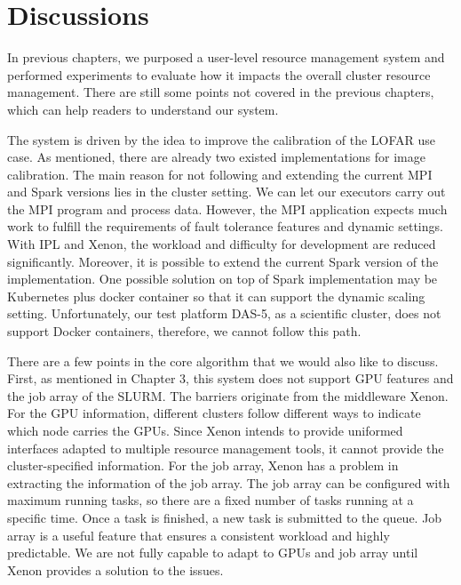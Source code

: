 
\chapter{Discussions} %






% 


In previous chapters, we purposed a user-level resource management system and performed experiments to evaluate how it impacts the overall cluster resource management. 
There are still some points not covered in the previous chapters, which can help readers to understand our system.

The system is driven by the idea to improve the calibration of the LOFAR use case.
As mentioned, there are already two existed implementations for image calibration. 
The main reason for not following and extending the current MPI and Spark versions lies in the cluster setting. 
We can let our executors carry out the MPI program and process data. 
However, the MPI application expects much work to fulfill the requirements of fault tolerance features and dynamic settings.
With IPL and Xenon, the workload and difficulty for development are reduced significantly.  
Moreover, it is possible to extend the current Spark version of the implementation. 
One possible solution on top of Spark implementation may be Kubernetes plus docker container so that it can support the dynamic scaling setting. 
Unfortunately, our test platform DAS-5, as a scientific cluster, does not support Docker containers, therefore, we cannot follow this path.

There are a few points in the core algorithm that we would also like to discuss. 
First, as mentioned in Chapter 3, this system does not support GPU features and the job array of the SLURM. 
The barriers originate from the middleware Xenon. For the GPU information, different clusters follow different ways to indicate which node carries the GPUs. 
Since Xenon intends to provide uniformed interfaces adapted to multiple resource management tools, it cannot provide the cluster-specified information. 
For the job array, Xenon has a problem in extracting the information of the job array. 
The job array can be configured with maximum running tasks, so there are a fixed number of tasks running at a specific time. 
Once a task is finished, a new task is submitted to the queue. 
Job array is a useful feature that ensures a consistent workload and highly predictable. 
We are not fully capable to adapt to GPUs and job array until Xenon provides a solution to the issues.
 
